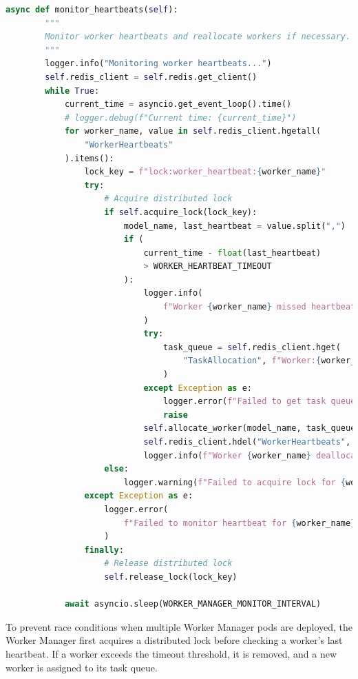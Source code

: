 \begin{lstlisting}[language=python, caption={Worker Fault Tolerance Mechanism}, label={lst:worker_fault_tolerance}]
  async def monitor_heartbeats(self):
        """
        Monitor worker heartbeats and reallocate workers if necessary.
        """
        logger.info("Monitoring worker heartbeats...")
        self.redis_client = self.redis.get_client()
        while True:
            current_time = asyncio.get_event_loop().time()
            # logger.debug(f"Current time: {current_time}")
            for worker_name, value in self.redis_client.hgetall(
                "WorkerHeartbeats"
            ).items():
                lock_key = f"lock:worker_heartbeat:{worker_name}"
                try:
                    # Acquire distributed lock
                    if self.acquire_lock(lock_key):
                        model_name, last_heartbeat = value.split(",")
                        if (
                            current_time - float(last_heartbeat)
                            > WORKER_HEARTBEAT_TIMEOUT
                        ):
                            logger.info(
                                f"Worker {worker_name} missed heartbeat. Allocating new worker."
                            )
                            try:
                                task_queue = self.redis_client.hget(
                                    "TaskAllocation", f"Worker:{worker_name}"
                                )
                            except Exception as e:
                                logger.error(f"Failed to get task queue: {str(e)}")
                                raise
                            self.allocate_worker(model_name, task_queue)
                            self.redis_client.hdel("WorkerHeartbeats", worker_name)
                            logger.info(f"Worker {worker_name} deallocated.")
                    else:
                        logger.warning(f"Failed to acquire lock for {worker_name}")
                except Exception as e:
                    logger.error(
                        f"Failed to monitor heartbeat for {worker_name}: {str(e)}"
                    )
                finally:
                    # Release distributed lock
                    self.release_lock(lock_key)

            await asyncio.sleep(WORKER_MANAGER_MONITOR_INTERVAL)
\end{lstlisting}

To prevent race conditions when multiple Worker Manager pods are deployed, the Worker Manager first acquires a distributed lock before checking a worker’s last heartbeat. If a worker exceeds the timeout threshold, it is removed, and a new worker is assigned to its task queue.

